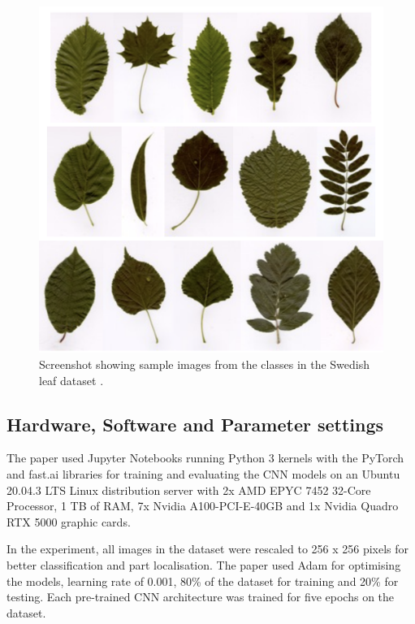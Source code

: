 \documentclass[conference]{IEEEtran}
\begin{document}
    \begin{figure}
   

        
        \centerline{\includegraphics[scale=0.25]{figures/Screenshot 2021-11-25 at 13.34.07.png}}
         \caption{Screenshot showing sample images from the classes in the Swedish leaf dataset \cite{soderkvist2001computer}.}

        \label{fig:gate4}
    \end{figure}




    

\subsection{Hardware, Software and Parameter settings}
The paper used Jupyter Notebooks \cite{kluyver2016jupyter} running Python 3 kernels with the PyTorch \cite{paszke2017automatic} and fast.ai \cite{howard2018fastai} libraries for training and evaluating the CNN models on an Ubuntu 20.04.3 LTS Linux distribution server with 2x AMD EPYC 7452 32-Core Processor, 1 TB of RAM, 7x Nvidia A100-PCI-E-40GB and 1x Nvidia Quadro RTX 5000 graphic cards.

In the experiment, all images in the dataset were rescaled to 256 x 256 pixels for better classification and part localisation. The paper used Adam \cite{kingma2014adam} for optimising the models, learning rate of 0.001, 80\% of the dataset for training and 20\% for testing. Each pre-trained CNN architecture was trained for five epochs on the dataset.
\end{document}
